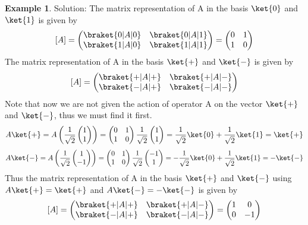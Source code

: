 \documentclass[12pt, oneside]{book}
\theoremstyle{definition}
\theoremstyle{definition}
\newtheorem{example}{Example}[section]
\theoremstyle{remark}
\begin{document}
\begin{example}
    Solution: The matrix representation of A in the basis $\ket{0}$ and $\ket{1}$ is given by
    \[[A]=\begin{pmatrix} \braket{0|A|0} & \braket{0|A|1} \\ \braket{1|A|0} & \braket{1|A|1} \end{pmatrix}=\begin{pmatrix} 0 & 1 \\ 1 & 0 \end{pmatrix}\]
    The matrix representation of A in the basis $\ket{+}$ and $\ket{-}$ is given by
    \[[A]=\begin{pmatrix} \braket{+|A|+} & \braket{+|A|-} \\ \braket{-|A|+} & \braket{-|A|-} \end{pmatrix}\]
    Note that now we are not given the action of operator A on the vector $\ket{+}$ and $\ket{-}$, thus we must find it first.
    \[A\ket{+}=A\left(\frac{1}{\sqrt{2}}\begin{pmatrix} 1 \\ 1 \end{pmatrix}\right)=\begin{pmatrix} 0 & 1 \\ 1 & 0 \end{pmatrix}\frac{1}{\sqrt{2}}\begin{pmatrix} 1 \\ 1 \end{pmatrix}=\frac{1}{\sqrt{2}}\ket{0}+\frac{1}{\sqrt{2}}\ket{1}=\ket{+}\]
    \[A\ket{-}=A\left(\frac{1}{\sqrt{2}}\begin{pmatrix} 1 \\ -1 \end{pmatrix}\right)=\begin{pmatrix} 0 & 1 \\ 1 & 0 \end{pmatrix}\frac{1}{\sqrt{2}}\begin{pmatrix} -1 \\ 1 \end{pmatrix}=-\frac{1}{\sqrt{2}}\ket{0}+\frac{1}{\sqrt{2}}\ket{1}=-\ket{-}\]
    Thus the matrix representation of A in the basis $\ket{+}$ and $\ket{-}$ using $A\ket{+}=\ket{+}$ and $A\ket{-}=-\ket{-}$ is given by
    \[[A]=\begin{pmatrix} \braket{+|A|+} & \braket{+|A|-} \\ \braket{-|A|+} & \braket{-|A|-} \end{pmatrix}=\begin{pmatrix} 1 & 0 \\ 0 & -1 \end{pmatrix}\]
\end{example}
\end{document}
